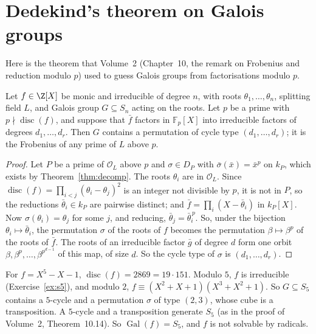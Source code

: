 \section{Dedekind's theorem on Galois groups}

Here is the theorem that Volume~2 (Chapter~10, the remark on Frobenius and reduction modulo $p$) used to guess Galois groups from factorisations modulo $p$.

\begin{theorem}[Dedekind]\label{thm:dedekindcycle}
Let $f\in\Z[X]$ be monic and irreducible of degree $n$, with roots $\theta_1,\dots,\theta_n$, splitting field $L$, and
Galois group $G\subseteq S_n$ acting on the roots. Let $p$ be a prime with $p\nmid\operatorname{disc}(f)$, and suppose that
$\bar f$ factors in $\mathbb F_p[X]$ into irreducible factors of degrees $d_1,\dots,d_r$. Then $G$ contains a permutation
of cycle type $(d_1,\dots,d_r)$; it is the Frobenius of any prime of $L$ above $p$.
\end{theorem}
\begin{proof}
Let $P$ be a prime of $\mathcal O_L$ above $p$ and $\sigma\in D_P$ with $\bar\sigma(\bar x)=\bar x^p$ on $k_P$, which
exists by Theorem~\ref{thm:decomp}. The roots $\theta_i$ are in $\mathcal O_L$. Since $\operatorname{disc}(f)=\prod_{i<j}
(\theta_i-\theta_j)^2$ is an integer not divisible by $p$, it is not in $P$, so the reductions $\bar\theta_i\in k_P$ are
pairwise distinct; and $\bar f=\prod_i(X-\bar\theta_i)$ in $k_P[X]$. Now $\sigma(\theta_i)=\theta_j$ for some $j$, and
reducing, $\bar\theta_j=\bar\theta_i^{\,p}$. So, under the bijection $\theta_i\mapsto\bar\theta_i$, the permutation
$\sigma$ of the roots of $f$ becomes the permutation $\beta\mapsto\beta^p$ of the roots of $\bar f$. The roots of an
irreducible factor $\bar g$ of degree $d$ form one orbit $\beta,\beta^p,\dots,\beta^{p^{d-1}}$ of this map, of size $d$.
So the cycle type of $\sigma$ is $(d_1,\dots,d_r)$.
\end{proof}

\begin{example}
For $f=X^5-X-1$, $\operatorname{disc}(f)=2869=19\cdot151$. Modulo $5$, $f$ is irreducible (Exercise~\ref{ex:s5}), and
modulo $2$, $f\equiv(X^2+X+1)(X^3+X^2+1)$. So $G\subseteq S_5$ contains a $5$-cycle and a permutation $\sigma$ of type
$(2,3)$, whose cube is a transposition. A $5$-cycle and a transposition generate $S_5$ (as in the proof of Volume~2,
Theorem~10.14). So $\operatorname{Gal}(f)=S_5$, and $f$ is not solvable by radicals.
\end{example}

